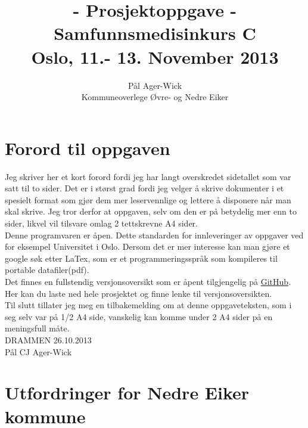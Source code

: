 \documentclass[11pt]{memoir} %
\title{- Prosjektoppgave - \\ Samfunnsmedisinkurs C \\ Oslo, 11.- 13. November 2013}
\author{Pål Ager-Wick \\ Kommuneoverlege Øvre- og Nedre Eiker}
\date{} %
\begin{document}
			\renewcommand{\chaptername}{Del}
            \renewcommand{\contentsname}{Innhold}
            \renewcommand\listfigurename{Illustrasjoner}
            \renewcommand\tablename{Tabell}
			\renewcommand\listtablename{Tabeller}
            \renewcommand{\figurename}{Illustrasjon}

\frontmatter

\maketitle

\chapter{Forord til oppgaven}
	Jeg skriver her et kort forord fordi jeg har langt overskredet sidetallet som var satt til to sider. Det er i størst grad fordi jeg velger å skrive dokumenter i et spesielt format som gjør dem mer leservennlige og lettere å disponere når man skal skrive. Jeg tror derfor at oppgaven, selv om den er på betydelig mer enn to sider, likvel vil tilsvare omlag 2 tettskrevne A4 sider.\\

	Denne programvaren er åpen. Dette standarden for innleveringer av oppgaver ved for eksempel Universitet i Oslo. Dersom det er mer interesse kan man gjøre et google søk etter LaTex, som er et programmeringsspråk som kompileres til portable datafiler(pdf).\\

	Det finnes en fullstendig versjonsoversikt som er åpent tilgjengelig på \href{http://pcjawick.github.io/Folkehelseoppgave}{GitHub}. Her kan du laste ned hele prosjektet og finne lenke til versjonsoversikten.\\

	Til slutt tillater jeg meg en tilbakemelding om at denne oppgaveteksten, som i seg selv var på 1/2 A4 side, vanskelig kan komme under 2 A4 sider på en meningsfull måte.\\[1in]



DRAMMEN 26.10.2013\\[0.5in]

Pål CJ Ager-Wick

\newpage

\tableofcontents

\mainmatter

\chapter{Utfordringer for Nedre Eiker kommune}
\end{document}
